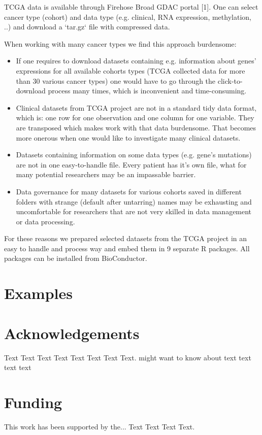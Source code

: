 \documentclass{bioinfo}
\begin{document}
TCGA data is available through Firehose Broad GDAC portal [1]. One can select cancer type (cohort) and data type (e.g. clinical, RNA expression, methylation, ..) and download a `tar.gz` file with compressed data. 

When working with many cancer types we find this approach burdensome:

\begin{itemize}
\item If one requires to download datasets containing e.g. information about genes' expressions for all available cohorts types (TCGA collected data for more than 30 various cancer types) one would have to go through the click-to-download process many times, which is inconvenient and time-consuming.
\item Clinical datasets from TCGA project are not in a standard tidy data format, which is: one row for one observation and one column for one variable. They are transposed which makes work with that data burdensome. That becomes more onerous when one would like to investigate
many clinical datasets.
\item Datasets containing information on some data types (e.g. gene's mutations) are not in one easy-to-handle file. Every patient has it's own file, what for many potential researchers may be an impassable barrier. 
\item Data governance for many datasets for various cohorts saved in different folders with strange (default after untarring) names may be exhausting and uncomfortable for researchers that are not very skilled in data management or data processing.
\end{itemize}
For these reasons we prepared selected datasets from the TCGA project in an easy to handle and process way and embed them in 9 separate R packages. All packages can be installed from BioConductor.


\section{Examples}

\section*{Acknowledgements}

Text Text Text Text Text Text  Text Text.  \citealp{Boffelli03} might want to know about  text
text text text\vspace*{-12pt}

\section*{Funding}

This work has been supported by the... Text Text  Text Text.\vspace*{-12pt}

%
%
%
%
%
%
%
%
%


\begin{thebibliography}{}

\end{thebibliography}
\end{document}
